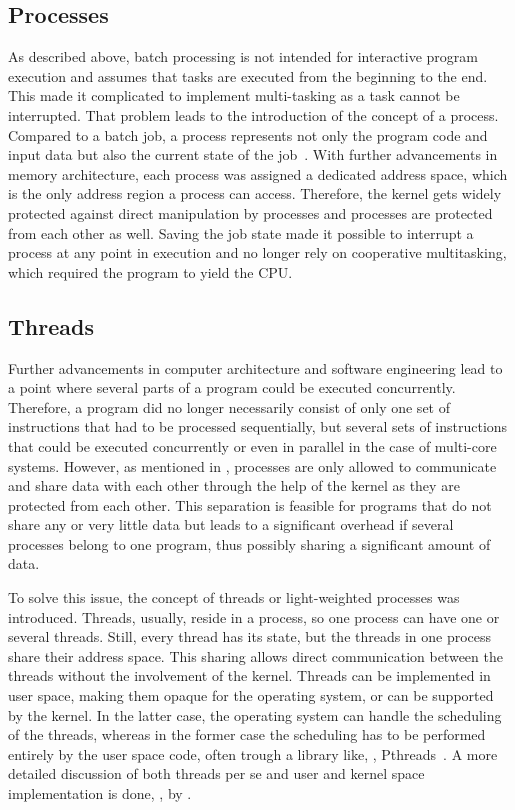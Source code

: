 \subsection{Processes}%
\label{sec:analysis:exec:process}

As described above, batch processing is not intended for interactive program execution and assumes that tasks are executed from the beginning to the end. This made it complicated to implement multi-tasking as a task cannot be interrupted. That problem leads to the introduction of the concept of a process. Compared to a batch job, a process represents not only the program code and input data but also the current state of the job~\cite[130\psq]{Stallings-2011-OperatingSystems}. With further advancements in memory architecture, each process was assigned a dedicated address space, which is the only address region a process can access. Therefore, the kernel gets widely protected against direct manipulation by processes and processes are protected from each other as well. Saving the job state made it possible to interrupt a process at any point in execution and no longer rely on cooperative multitasking, which required the program to yield the CPU.

\subsection{Threads}%
\label{sec:analysis:exec:threads}

Further advancements in computer architecture and software engineering lead to a point where several parts of a program could be executed concurrently. Therefore, a program did no longer necessarily consist of only one set of instructions that had to be processed sequentially, but several sets of instructions that could be executed concurrently or even in parallel in the case of multi-core systems. However, as mentioned in , processes are only allowed to communicate and share data with each other through the help of the kernel as they are protected from each other. This separation is feasible for programs that do not share any or very little data but leads to a significant overhead if several processes belong to one program, thus possibly sharing a significant amount of data.

To solve this issue, the concept of threads or light-weighted processes was introduced. Threads, usually, reside in a process, so one process can have one or several threads. Still, every thread has its state, but the threads in one process share their address space. This sharing allows direct communication between the threads without the involvement of the kernel. Threads can be implemented in user space, making them opaque for the operating system, or can be supported by the kernel. In the latter case, the operating system can handle the scheduling of the threads, whereas in the former case the scheduling has to be performed entirely by the user space code, often trough a library like, \eg, \acp{Pthread}~\cite{POSIX}. A more detailed discussion of both threads per se and user and kernel space implementation is done, \eg, by \textcite[177\psq]{Stallings-2011-OperatingSystems}.

